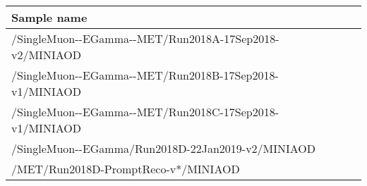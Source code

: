 \footnotesize
\begin{tabular}{lrr}
  \hline
  \textbf{Sample name} \\
  \hline
  \ttfamily/SingleMuon-{}-EGamma-{}-MET/Run2018A-17Sep2018-v2/MINIAOD \\
  \ttfamily/SingleMuon-{}-EGamma-{}-MET/Run2018B-17Sep2018-v1/MINIAOD \\
  \ttfamily/SingleMuon-{}-EGamma-{}-MET/Run2018C-17Sep2018-v1/MINIAOD \\
  \ttfamily/SingleMuon-{}-EGamma/Run2018D-22Jan2019-v2/MINIAOD \\
  \ttfamily/MET/Run2018D-PromptReco-v*/MINIAOD \\
  \hline
\end{tabular}
